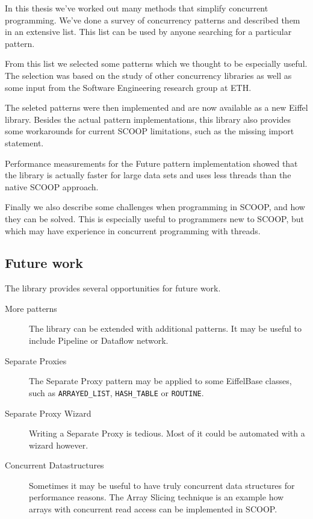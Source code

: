 \documentclass[a4paper,10pt]{article}
\begin{document}
In this thesis we've worked out many methods that simplify concurrent programming.
We've done a survey of concurrency patterns and described them in an extensive list.
This list can be used by anyone searching for a particular pattern.

From this list we selected some patterns which we thought to be especially useful.
The selection was based on the study of other concurrency libraries as well as some input from the Software Engineering research group at ETH.

The seleted patterns were then implemented and are now available as a new Eiffel library.
Besides the actual pattern implementations, this library also provides some workarounds for current SCOOP limitations, such as the missing import statement.

Performance measurements for the Future pattern implementation showed that the library is actually faster for large data sets and uses less threads than the native SCOOP approach.

Finally we also describe some challenges when programming in SCOOP, and how they can be solved.
This is especially useful to programmers new to SCOOP, but which may have experience in concurrent programming with threads.

\subsection{Future work}

The library provides several opportunities for future work.

\begin{description}
 \item [More patterns] The library can be extended with additional patterns.
 It may be useful to include Pipeline or Dataflow network.
 \item [Separate Proxies] The Separate Proxy pattern may be applied to some EiffelBase classes, such as \lstinline!ARRAYED_LIST!, \lstinline!HASH_TABLE! or \lstinline!ROUTINE!.
 \item [Separate Proxy Wizard] Writing a Separate Proxy is tedious. Most of it could be automated with a wizard however.
 \item [Concurrent Datastructures] Sometimes it may be useful to have truly concurrent data structures for performance reasons.
The Array Slicing technique \cite{paper:array-slicing} is an example how arrays with concurrent read access can be implemented in SCOOP.
\end{description}
\end{document}
